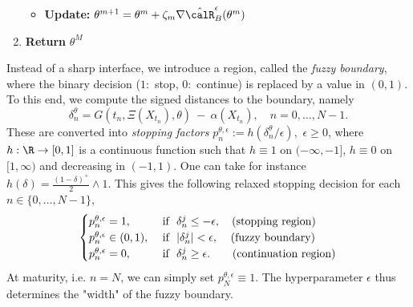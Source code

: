 \begin{algorithm}[t]
\begin{enumerate}
\begin{itemize}
        \item \textbf{Update:} $\theta^{m+1} = \theta^{m} + \zeta_m \nabla \hat{\calR}_B^{\epsilon}(\theta^{m})$
    \end{itemize}
\item \textbf{Return} $\theta^{M}$
\vspace{-3mm}

\end{enumerate}
\end{algorithm}

Instead of a sharp interface, we introduce a region,  called the \textit{fuzzy boundary}, where the binary decision ($1:$  stop, $0:$ continue) is replaced by a value in $(0,1)$. %
To this end,  we compute the signed distances to the boundary, namely
 \begin{equation}
     \delta^{\theta}_n =  G(t_n,\Xi(X_{t_n}),\theta) \ - \ \alpha(X_{t_n}), \quad n=0,\ldots ,N-1. 
 \end{equation}
 These are converted into \textit{stopping factors}  
$p^{\theta,\epsilon}_n := h(\delta^{\theta}_n /\epsilon), $ $\epsilon \ge 0$, where $h:\R \to [0,1]$ is a continuous function such that $h \equiv 1$ on $(-\infty,-1]$,  $h \equiv 0$ on $[1,\infty)$ and decreasing in $(-1,1)$. One can take for instance $h(\delta) = \frac{(1-\delta)^+ }{2} \wedge 1$. This gives the following  relaxed stopping decision for each $n\in\{0,\ldots,N-1\}$, 
$$ \begin{cases}
p^{\theta,\epsilon}_n = 1, & \text{ if } \  \delta^j_n \le -\epsilon,  \quad \text{(stopping region)}\\%
p^{\theta,\epsilon}_n \in (0,1), & \text{ if } \   |\delta_n^{j}| < \epsilon, \hspace{0.4 mm} \quad \text{(fuzzy boundary)}\\
p^{\theta,\epsilon}_n = 0, & \text{ if } \  \delta^j_n \ge \epsilon. 
\hspace{3.5 mm} \quad \text{(continuation region)}%
\end{cases} $$
At maturity, i.e.  $n=N$, we can simply set $p^{\theta,\epsilon}_N \equiv 1$. %
The hyperparameter $\epsilon$ thus determines the "width" of the fuzzy boundary. %

